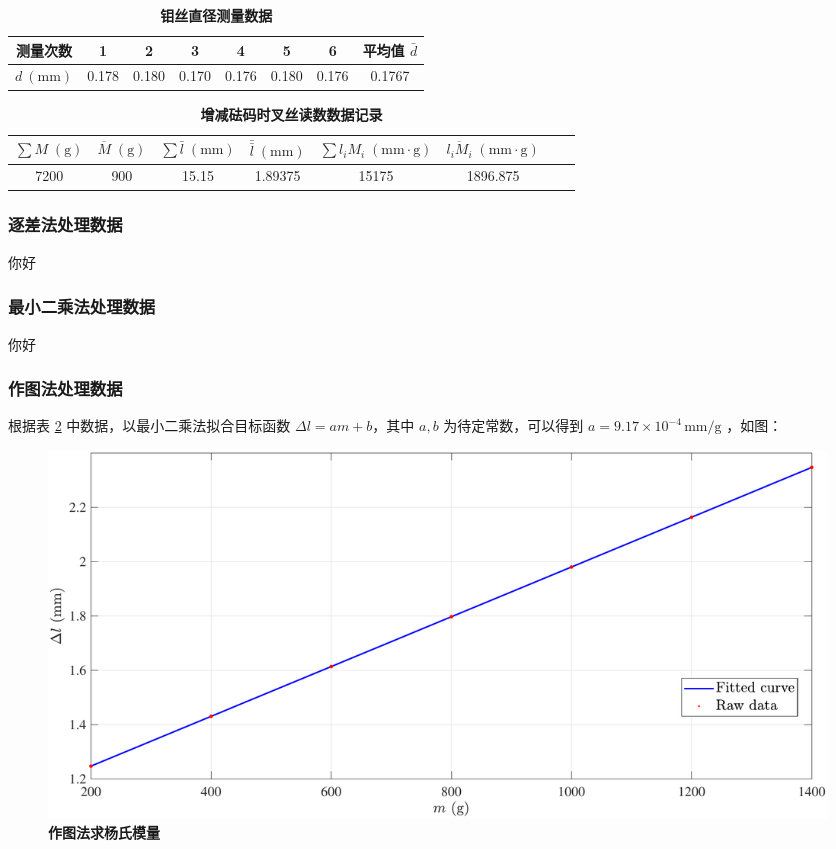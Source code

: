\documentclass[UTF8]{article}
\theoremstyle{MyLineTheoremStyle} %
\theoremstyle{MyBlockTheoremStyle} %
\theoremstyle{MySubsubsectionStyle} %
\begin{document}
\begin{table}[H]
    \centering
    \caption{\textbf{钼丝直径测量数据}}
    \label{钼丝直径测量数据}
    \begin{tabular}{cccccccc}
    \toprule
    测量次数 &1&2&3&4&5&6& 平均值 $\bar{d}$ \\
    \midrule
    $d\ (\mathrm{mm})$ &0.178&0.180&0.170&0.176&0.180&0.176&0.1767\\ 
    \bottomrule
    \end{tabular}
\end{table}

\begin{table}[H]
    \centering
    \caption{\textbf{增减砝码时叉丝读数数据记录}}
    \label{增减砝码时叉丝读数数据记录}
    \begin{tabular}{cccccccc}
    \toprule
    $ \sum M\;(\mathrm g) $&$ \overline M\;(\mathrm g) $&$ \sum\bar l\;(\mathrm{mm}) $&$ \bar{\bar l}\;(\mathrm{mm}) $&$ \sum l_iM_i\;(\mathrm{mm\cdot g}) $&$ \overline{l_iM_i}\;(\mathrm{mm\cdot g}) $\\
    \midrule
    7200&900&15.15&1.89375&15175&1896.875\\ 
    \bottomrule
    \end{tabular}
\end{table}

\subsubsection{逐差法处理数据}
你好
\subsubsection{最小二乘法处理数据}
你好
\subsubsection{作图法处理数据}

根据表 \ref{增减砝码时叉丝读数数据记录} 中数据，以最小二乘法拟合目标函数 $\Delta l = am+b $，其中 $a,b$ 为待定常数，可以得到 $a= 9.17\times10^{-4}\,\mathrm{mm/g}$ ，如图：

\begin{figure}[H]
    \centering
    \includegraphics[width=\textwidth]{assets/2024-08-23_19-54-13.pdf}
    \caption{\textbf{作图法求杨氏模量}}\label{作图法求杨氏模量}
\end{figure}
\end{document}
